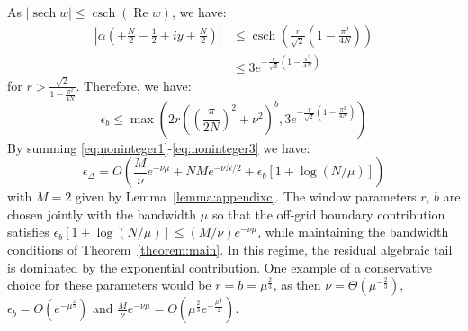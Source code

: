 As $|\operatorname{sech} w| \leq \operatorname{csch}(\operatorname{Re} w)$, we have:
\begin{align}
    \left|\alpha(\pm\frac{N}{2}-\frac12+iy+\frac{N}{2})\right| &\leq \operatorname{csch}\left(\frac{r}{\sqrt{2}}\left(1-\frac{\pi^2}{4N}\right)\right)\\
    &\leq 3e^{-\frac{r}{\sqrt{2}}\left(1-\frac{\pi^2}{4N}\right)}
\end{align}
for $r > \frac{\sqrt{2}}{1-\frac{\pi^2}{4N}}$. Therefore, we have:
\begin{equation}
    \epsilon_b \leq \max\left(2r\left(
\left(\frac{\pi}{2N}\right)^2+\nu^2
\right)^{b},3e^{-\frac{r}{\sqrt{2}}\left(1-\frac{\pi^2}{4N}\right)}\right)
\end{equation}
By summing \eqref{eq:noninteger1}-\eqref{eq:noninteger3} we have:
\begin{equation}
\epsilon_\Delta=O\!\left(\frac{M}{\nu}e^{-\nu\mu}+NM e^{-\nu N/2}+\epsilon_b[1+\log(N/\mu)]\right)
\end{equation}
with $M = 2$ given by Lemma~\ref{lemma:appendixc}. The window parameters $r$, $b$ are chosen jointly with the bandwidth $\mu$ so that the off-grid boundary contribution satisfies \(\epsilon_b[1+\log(N/\mu)]\le (M/\nu)e^{-\nu\mu}\), while maintaining the bandwidth conditions of Theorem~\ref{theorem:main}. In this regime, the residual algebraic tail is dominated by the exponential contribution. One example of a conservative choice for these parameters would be $r=b=\mu^{\frac{2}{3}}$, as then $\nu = \Theta(\mu^{-\frac{2}{3}})$, $\epsilon_b = O(e^{-\mu^{\frac{2}{3}}})$ and $\frac{M}{\nu}e^{-\nu \mu} = O(\mu^{\frac{2}{3}}e^{-\frac{\mu^{\frac{1}{3}}}{2}})$.
